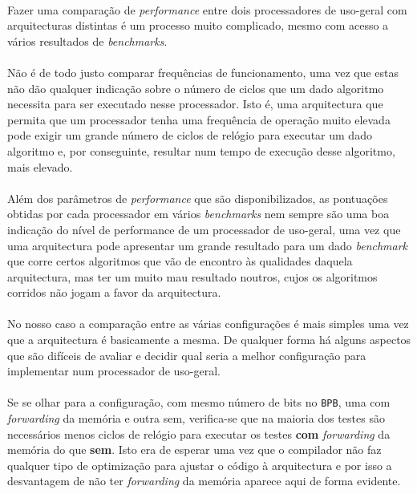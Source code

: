 \paragraph{} Fazer uma comparação de \textit{performance} entre dois processadores de uso-geral com arquitecturas distintas é um processo muito complicado, mesmo com acesso a vários resultados de \textit{benchmarks}. 

\paragraph{} Não é de todo justo comparar frequências de funcionamento, uma vez que estas não dão qualquer indicação sobre o número de ciclos que um dado algoritmo necessita para ser executado nesse processador. Isto é, uma arquitectura que permita que um processador tenha uma frequência de operação muito elevada pode exigir um grande número de ciclos de relógio para executar um dado algoritmo e, por conseguinte, resultar num tempo de execução desse algoritmo, mais elevado.

\paragraph{} Além dos parâmetros de \textit{performance} que são disponibilizados, as pontuações obtidas por cada processador em vários \textit{benchmarks} nem sempre são uma boa indicação do nível de performance de um processador de uso-geral, uma vez que uma arquitectura pode apresentar um grande resultado para um dado \textit{benchmark} que corre certos algoritmos que vão de encontro às qualidades daquela arquitectura, mas ter um muito mau resultado noutros, cujos os algoritmos corridos não jogam a favor da arquitectura.

\paragraph{} No nosso caso a comparação entre as várias configurações é mais simples uma vez que a arquitectura é basicamente a mesma. De qualquer forma há alguns aspectos que são difíceis de avaliar e decidir qual seria a melhor configuração para implementar num processador de uso-geral.

\paragraph{} Se se olhar para a configuração, com mesmo número de bits no \texttt{BPB}, uma com \textit{forwarding} da memória e outra sem, verifica-se que na maioria dos testes são necessários menos ciclos de relógio para executar os testes \textbf{com} \textit{forwarding} da memória do que \textbf{sem}. Isto era de esperar uma vez que o compilador não faz qualquer tipo de optimização para ajustar o código à arquitectura e por isso a desvantagem de não ter \textit{forwarding} da memória aparece aqui de forma evidente.


